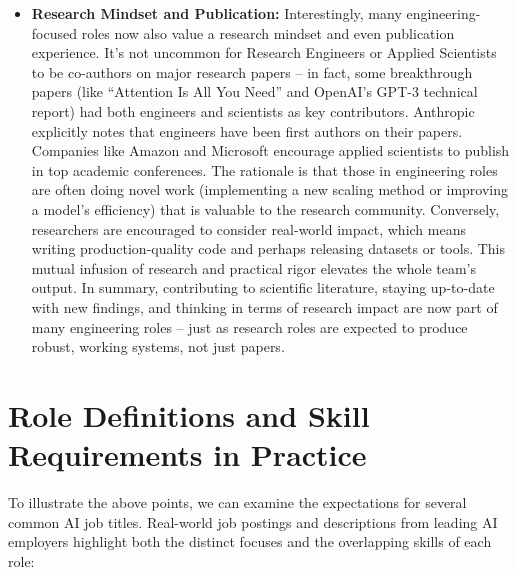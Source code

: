 \documentclass[pdflatex,sn-mathphys-num]{sn-jnl}%
\theoremstyle{thmstyleone}%
\theoremstyle{thmstyletwo}%
\theoremstyle{thmstylethree}%
\begin{document}
\begin{itemize}
\item \textbf{Research Mindset and Publication:} Interestingly, many engineering-focused roles now also value a research mindset and even publication experience. It’s not uncommon for Research Engineers or Applied Scientists to be co-authors on major research papers – in fact, some breakthrough papers (like “Attention Is All You Need” and OpenAI’s GPT-3 technical report) had both engineers and scientists as key contributors. Anthropic explicitly notes that engineers have been first authors on their papers\cite{AnthropicCareers2023}. Companies like Amazon and Microsoft encourage applied scientists to publish in top academic conferences. The rationale is that those in engineering roles are often doing novel work (implementing a new scaling method or improving a model’s efficiency) that is valuable to the research community. Conversely, researchers are encouraged to consider real-world impact, which means writing production-quality code and perhaps releasing datasets or tools. This mutual infusion of research and practical rigor elevates the whole team’s output. In summary, contributing to scientific literature, staying up-to-date with new findings, and thinking in terms of research impact are now part of many engineering roles – just as research roles are expected to produce robust, working systems, not just papers. 
\end{itemize}

\section{Role Definitions and Skill Requirements in Practice}
To illustrate the above points, we can examine the expectations for several common AI job titles. Real-world job postings and descriptions from leading AI employers highlight both the distinct focuses and the overlapping skills of each role:
\end{document}
